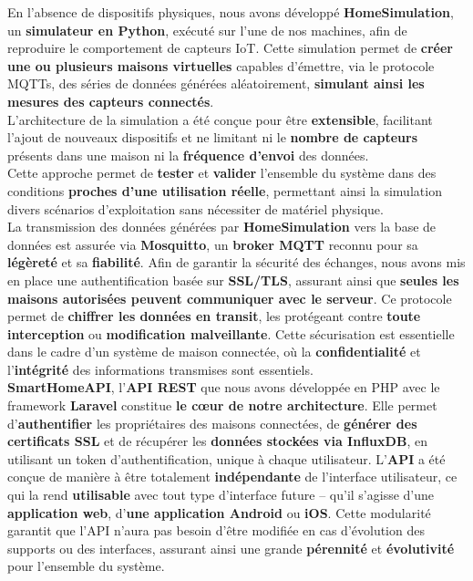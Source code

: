 \documentclass[10pt, a4paper]{report}
\begin{document}
	En l'absence de dispositifs physiques, nous avons développé \textbf{HomeSimulation}, un \textbf{simulateur en Python}, exécuté sur l’une de nos machines, afin de reproduire le comportement de capteurs IoT. Cette simulation permet de \textbf{créer une ou plusieurs maisons virtuelles} capables d’émettre, via le protocole MQTTs, des séries de données générées aléatoirement, \textbf{simulant ainsi les mesures des capteurs connectés}.\\
	L’architecture de la simulation a été conçue pour être \textbf{extensible}, facilitant l’ajout de nouveaux dispositifs et ne limitant ni le \textbf{nombre de capteurs} présents dans une maison ni la \textbf{fréquence d’envoi} des données.\\
	Cette approche permet de \textbf{tester} et \textbf{valider} l’ensemble du système dans des conditions \textbf{proches d’une utilisation réelle}, permettant ainsi la simulation divers scénarios d’exploitation sans nécessiter de matériel physique.\\
	
	La transmission des données générées par \textbf{HomeSimulation} vers la base de données est assurée via \textbf{Mosquitto}, un \textbf{broker MQTT} reconnu pour sa \textbf{légèreté} et sa \textbf{fiabilité}. Afin de garantir la sécurité des échanges, nous avons mis en place une authentification basée sur \textbf{SSL/TLS}, assurant ainsi que \textbf{seules les maisons autorisées peuvent communiquer avec le serveur}. Ce protocole permet de \textbf{chiffrer les données en transit}, les protégeant contre \textbf{toute interception} ou \textbf{modification malveillante}. Cette sécurisation est essentielle dans le cadre d’un système de maison connectée, où la \textbf{confidentialité} et l’\textbf{intégrité} des informations transmises sont essentiels.\\
	
	\textbf{SmartHomeAPI}, l'\textbf{API REST} que nous avons développée en PHP avec le framework \textbf{Laravel} constitue \textbf{le cœur de notre architecture}. Elle permet d'\textbf{authentifier} les propriétaires des maisons connectées, de \textbf{générer des certificats SSL} et de récupérer les \textbf{données stockées via InfluxDB}, en utilisant un token d'authentification, unique à chaque utilisateur. L'\textbf{API} a été conçue de manière à être totalement \textbf{indépendante} de l'interface utilisateur, ce qui la rend \textbf{utilisable} avec tout type d'interface future – qu'il s'agisse d'une \textbf{application web}, d'\textbf{une application Android} ou \textbf{iOS}. Cette modularité garantit que l’API n’aura pas besoin d'être modifiée en cas d’évolution des supports ou des interfaces, assurant ainsi une grande \textbf{pérennité} et \textbf{évolutivité} pour l'ensemble du système.\\
	
\end{document}

